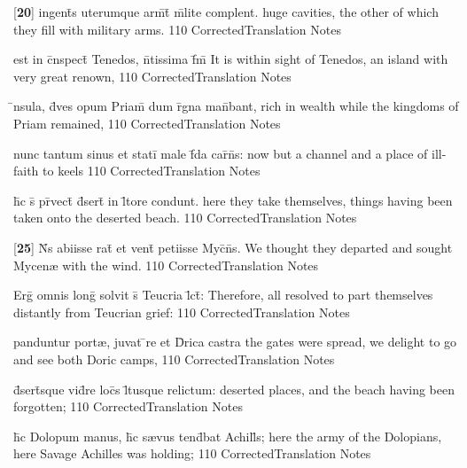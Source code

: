 \latline
  {[\textbf{20}] ingent\={\macron {\i}}s uterumque arm\={}t\={} m\={\macron {\i}}lite complent.}
  { huge cavities, the other of which they fill with military arms. }
  {110}
  { CorrectedTranslation }
  { Notes }


\latline
  {est in c\={}nspect\={} Tenedos, n\={}tissima f\={}m\={}}
  { It is within sight of Tenedos, an island with very great renown, }
  {110}
  { CorrectedTranslation }
  { Notes }


\latline
  {\={\macron {\i}}nsula, d\={\macron {\i}}ves opum Priam\={\macron {\i}} dum r\={}gna man\={}bant,}
  { rich in wealth while the kingdoms of Priam remained,  }
  {110}
  { CorrectedTranslation }
  { Notes }


\latline
  {nunc tantum sinus et stati\={} male f\={\macron {\i}}da car\={\macron {\i}}n\={\macron {\i}}s:}
  { now but a channel and a place of ill-faith to keels }
  {110}
  { CorrectedTranslation }
  { Notes }


\latline
  {h\={}c s\={} pr\={}vect\={\macron {\i}} d\={}sert\={} in l\={\macron {\i}}tore condunt.}
  { here they take themselves, things having been taken onto the deserted beach. }
  {110}
  { CorrectedTranslation }
  { Notes }


\latline
  {[\textbf{25}] N\={}s abiisse rat\={\macron {\i}} et vent\={} petiisse Myc\={}n\={}s.}
  { We thought they departed and sought Mycen{\ae} with the wind. }
  {110}
  { CorrectedTranslation }
  { Notes }


\latline
  {Erg\={} omnis long\={} solvit s\={} Teucria l\={}ct\={}:}
  { Therefore, all resolved to part themselves distantly from Teucrian grief: }
  {110}
  { CorrectedTranslation }
  { Notes }


\latline
  {panduntur port{\ae}, juvat \={\macron {\i}}re et D\={}rica castra}
  { the gates were spread, we delight to go and see both Doric camps, }
  {110}
  { CorrectedTranslation }
  { Notes }


\latline
  {d\={}sert\={}sque vid\={}re loc\={}s l\={\macron {\i}}tusque relictum:}
  { deserted places, and the beach having been forgotten; }
  {110}
  { CorrectedTranslation }
  { Notes }


\latline
  {h\={\macron {\i}}c Dolopum manus, h\={\macron {\i}}c s{\ae}vus tend\={}bat Achill\={}s;}
  { here the army of the Dolopians, here Savage Achilles was holding; }
  {110}
  { CorrectedTranslation }
  { Notes }


